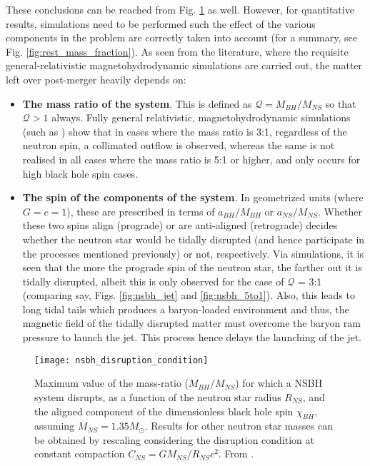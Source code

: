     These conclusions can be reached from Fig. \ref{fig:nsbh_disruption_condition} as
    well. However, for quantitative results, simulations need to be performed such the
    effect of the various components in the problem are correctly taken into account
    (for a summary, see Fig.  \ref{fig:rest_mass_fraction}). As seen from the
    literature, where the requisite general-relativistic magnetohydrodynamic simulations
    are carried out, the matter left over post-merger heavily depends on:

    \begin{itemize}

        \item \textbf{The mass ratio of the system}. This is defined as $\mathcal{Q} =
            M_{BH} / M_{NS}$ so that $\mathcal{Q} > 1$ always. Fully general
            relativistic, magnetohydrodynamic simulations (such as \cite{ruiz_2020})
            show that in cases where the mass ratio is 3:1, regardless of the neutron
            spin, a collimated outflow is observed, whereas the same is not realised in
            all cases where the mass ratio is 5:1 or higher, and only occurs for high
            black hole spin cases.

        \item \textbf{The spin of the components of the system}. In geometrized units
            (where $G = c = 1$), these are prescribed in terms of $a_{BH} / M_{BH}$ or
            $a_{NS} / M_{NS}$. Whether these two spins align (prograde) or are
            anti-aligned (retrograde) decides whether the neutron star would be tidally
            disrupted (and hence participate in the processes mentioned previously) or
            not, respectively. Via simulations, it is seen that the more the prograde
            spin of the neutron star, the farther out it is tidally disrupted, albeit
            this is only observed for the case of $\mathcal{Q}$ = 3:1 (comparing say,
            Figs.  \ref{fig:nsbh_jet} and \ref{fig:nsbh_5to1}). Also, this leads to long
            tidal tails which produces a baryon-loaded environment and thus, the
            magnetic field of the tidally disrupted matter must overcome the baryon ram
            pressure to launch the jet. This process hence delays the launching of the
            jet.

    \end{itemize}

    \begin{figure}[H]
        \centering
        \texttt{[image: nsbh\_disruption\_condition]}
        \caption[Disruption condition in a NSBH binary]
        {
            Maximum value of the mass-ratio ($M_{BH}/M_{NS}$) for which a NSBH
            system disrupts, as a function of the neutron star radius $R_{NS}$,
            and the aligned component of the dimensionless black hole spin
            $\chi_{BH}$, assuming $M_{NS} = 1.35 M_{\odot}$. Results for other
            neutron star masses can be obtained by rescaling considering the
            disruption condition at constant compaction $C_{NS} = GM_{NS}/R_{NS}
            c^2$. From \cite{foucart_2020}.
        }
        \label{fig:nsbh_disruption_condition}
    \end{figure}

